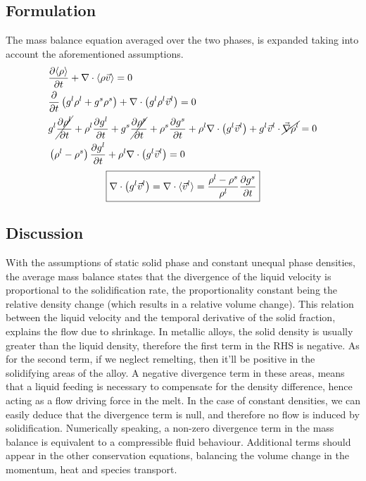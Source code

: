 \subsection{Formulation}
The mass balance equation averaged over the two phases, is expanded taking into account the aforementioned assumptions.
\begin{subequations}
\begin{align}
& \frac{\partial \langle \rho \rangle}{\partial t} + \nabla \cdot \langle \rho \vec{v} \rangle  = 0 \\ 
& \frac{\partial }{\partial t} \left(  {g^l} \rho^l + {g^s} \rho^s \right) + \nabla \cdot \left(  {g^l} \rho^l \vec{v}^l \right) = 0 \\ 
& {g^l} \cancel{\frac{\partial \rho^l }{\partial t}} + \rho^l \frac{\partial  {g^l} }{\partial t} 
	+ {g^s} \cancel{\frac{\partial \rho^s }{\partial t}} + \rho^s \frac{\partial  {g^s} }{\partial t} 
	+ \rho^l \nabla \cdot \left(  {g^l} \vec{v}^l \right) 
	+ {g^l} \vec{v}^l \cdot  \cancel{ \vec{\nabla} \rho^l }	 = 0 \\
& \left(  \rho^l - \rho^s  \right) \frac{\partial  {g^l} }{\partial t} + \rho^l \nabla \cdot \left(  {g^l} \vec{v}^l \right)  = 0
\end{align}
\end{subequations}
\begin{align}
\label{eq:mass_balance}
 \boxed{\nabla \cdot \left(  {g^l} \vec{v}^l \right) 
 	= \nabla \cdot \langle \vec{v}^l \rangle 
 	= \frac{\rho^l-\rho^s}{\rho^l} \frac{\partial  {g^s} }{\partial t}}
\end{align}
\subsection{Discussion}
With the assumptions of static solid phase and constant unequal phase densities, the average mass balance states that 
the divergence of the liquid velocity is proportional to the solidification rate, the proportionality constant being the
relative density change (which results in a relative volume change). This relation between the liquid velocity and the
temporal derivative of the solid fraction, explains the flow due to shrinkage. In metallic alloys, the solid density is
usually greater than the liquid density, therefore the first term in the RHS is negative. As for the second term, if we
neglect remelting, then it'll be positive in the solidifying areas of the alloy. A negative divergence term in these areas, 
means that a liquid feeding is necessary to compensate for the density difference, hence acting as a flow driving force in the melt.
In the case of constant densities, we can easily deduce that the divergence term is null, and therefore no flow is induced
by solidification.
\newline
Numerically speaking, a non-zero divergence term in the mass balance is equivalent to a compressible fluid behaviour. Additional 
terms should appear in the other conservation equations, balancing the volume change in the momentum, heat and species transport.

